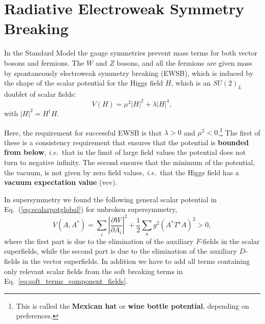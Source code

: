 \documentclass[notes.tex]{subfiles}
\begin{document}
\section{Radiative Electroweak Symmetry Breaking}
\label{sec:rewsb}
In the Standard Model the gauge symmetries prevent mass terms for both vector bosons and fermions. The $W$ and $Z$ bosons, and all the fermions are given mass by spontaneously electroweak symmetry breaking (EWSB), which is induced by the shape of the scalar potential for the Higgs field $H$, which is an $SU(2)_L$ doublet of scalar fields:
\begin{equation}
V(H) = \mu^2 |H|^2+ \lambda |H|^4,
\label{eq:SMscalarpot}
\end{equation}
with $|H|^2=H^\dagger H$. 

Here, the requirement for successful EWSB is that $\lambda > 0$ and $\mu^2 < 0$.\footnote{This is called the {\bf Mexican hat} or {\bf wine bottle potential}, depending on preferences.} The first of these is a consistency requirement that ensures that the potential is {\bf bounded from below}, {\it i.e.}\ that in the limit of large field values the potential does not turn to negative infinity. The second ensures that the minimum of the potential, the vacuum, is not given by zero field values, {\it i.e.}\ that the Higgs field has a {\bf vacuum expectation value} (vev).

In supersymmetry we found the following general scalar potential in Eq.~(\ref{eq:scalarpotglobal}) for unbroken supersymmetry,
\begin{equation}
V(A, A^*) = \sum_i \left|\frac{\partial W}{\partial A_i}\right|^2 + \frac{1}{2}\sum_a g^2(A^*T^aA)^2 >0,
\end{equation}
where the first part is due to the elimination of the auxiliary $F$-fields in the scalar superfields, while the second part is due to the elimination of the auxiliary $D$-fields in the vector superfields. In addition we have to add all terms containing only relevant scalar fields from the soft breaking terms in Eq.~\ref{eq:soft_terms_component_fields}.
\end{document}
